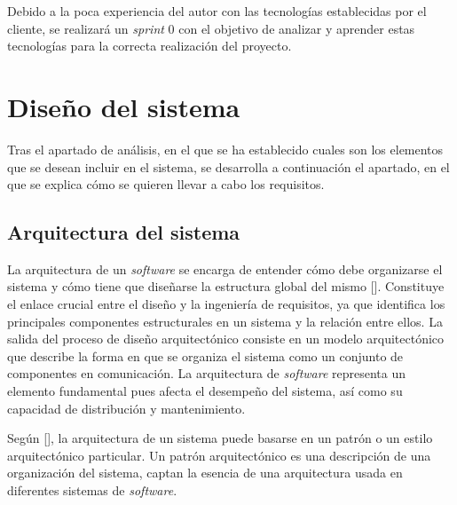 Debido a la poca experiencia del autor con las tecnologías establecidas por el cliente, se realizará un \textit{sprint} 0 con el objetivo de analizar y aprender estas tecnologías para la correcta realización del proyecto.

\section{Diseño del sistema}
Tras el apartado de análisis, en el que se ha establecido cuales son los elementos que se desean incluir en el sistema, se desarrolla a continuación el apartado, en el que se explica cómo se quieren llevar a cabo los requisitos.

\subsection{Arquitectura del sistema}
La arquitectura de un \textit{software} se encarga de entender cómo debe organizarse el sistema y cómo tiene que diseñarse la estructura global del mismo [\cite{91}]. Constituye el enlace crucial entre el diseño y la ingeniería de requisitos, ya que identifica los principales componentes estructurales en un sistema y la relación entre ellos. La salida del proceso de diseño arquitectónico consiste en un modelo arquitectónico que describe la  forma en que se organiza el sistema como un conjunto de componentes en comunicación. La arquitectura de \textit{software} representa un elemento fundamental pues afecta el desempeño del sistema, así como su capacidad de distribución y mantenimiento.

Según [\cite{99}], la arquitectura de un sistema puede basarse en un patrón o un estilo arquitectónico particular. Un patrón arquitectónico es una descripción de una organización del sistema, captan la esencia de una arquitectura usada en diferentes sistemas de \textit{software}.


